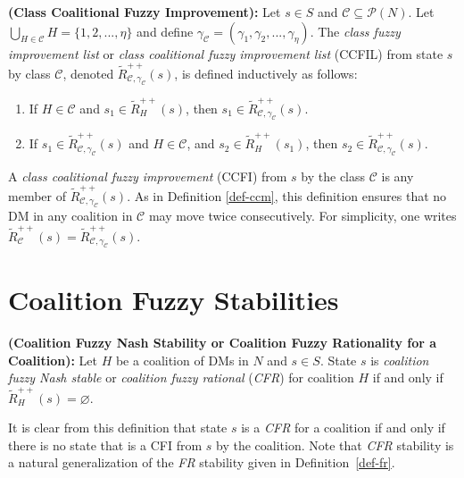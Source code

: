 \begin{definition}\label{def-ccfil}
\rm {\bf (Class Coalitional Fuzzy Improvement):} Let $s \in S $ and $\mathcal{C} \subseteq \mathcal{P}(N)$. Let $\bigcup_{H \in \mathcal{C}}H=\{1, 2, ..., \eta\}$ and define $\gamma_\mathcal{C}=(\gamma_1, \gamma_2, ..., \gamma_\eta)$. The \emph{class fuzzy improvement list}  or \emph{class coalitional fuzzy improvement list} (CCFIL) from state $s$ by class $\mathcal{C}$, denoted $\widetilde{R}_{\mathcal{C}, \gamma_\mathcal{C}}^{++}(s)$, is defined inductively as follows:
\begin{enumerate}[(1)]
\item If $H \in \mathcal{C}$ and $s_1 \in \widetilde{R}_H^{++}(s)$, then $s_1 \in \widetilde{R}_{\mathcal{C}, \gamma_\mathcal{C}}^{++}(s)$.
\item If $s_1 \in \widetilde{R}_{\mathcal{C}, \gamma_\mathcal{C}}^{++}(s)$ and $H \in \mathcal{C}$, and $s_2 \in \widetilde{R}_H^{++}(s_1)$, then $s_2 \in \widetilde{R}_{\mathcal{C}, \gamma_\mathcal{C}}^{++}(s)$.
\end{enumerate}
A \emph{class coalitional fuzzy improvement} (CCFI) from $s$ by the class $\mathcal{C}$ is any member of $\widetilde{R}_{\mathcal{C}, \gamma_\mathcal{C}}^{++}(s)$. As in Definition \ref{def-ccm}, this definition ensures that no DM in any coalition in $\mathcal{C}$ may move twice consecutively. For simplicity, one writes $\widetilde{R}_\mathcal{C}^{++}(s)=\widetilde{R}_{\mathcal{C}, \gamma_\mathcal{C}}^{++}(s)$.
\end{definition}

\section{Coalition Fuzzy Stabilities}\label{sec-cfs}

\begin{definition}\label{def-cfr-coal}
\rm {\bf (Coalition Fuzzy Nash Stability or Coalition Fuzzy Rationality for a Coalition):} Let $H$ be a coalition of DMs in $N$ and $s \in S$. State $s$ is \emph{coalition fuzzy Nash stable} or \emph{coalition fuzzy rational} (\emph{CFR}) for coalition $H$ if and only if $\widetilde{R}_H^{++}(s)=\varnothing$.
\end{definition}

It is clear from this definition that state $s$ is a \emph{CFR} for a coalition if and only if there is no state that is a CFI from $s$ by the coalition. Note that \emph{CFR} stability is a natural generalization of the \emph{FR} stability given in Definition~\ref{def-fr}.

